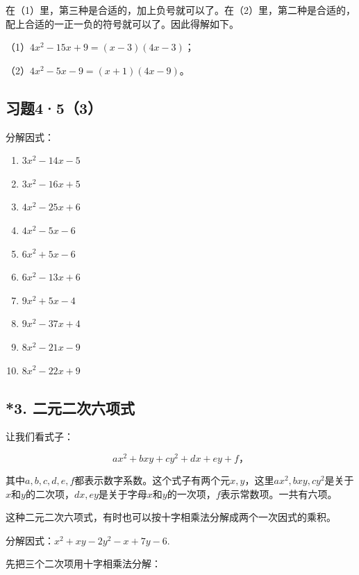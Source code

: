 在（1）里，第三种是合适的，加上负号就可以了。在（2）里，第二种是合适的，配上合适的一正一负的符号就可以了。因此得解如下。

 （1）\(4x^{2} - 15x + 9 = (x - 3)(4x - 3)\)；

（2）\(4x^{2} - 5x - 9 = (x + 1)(4x - 9)\)。

\subsection{习题4·5（3）}

分解因式：

\begin{enumerate}[start=1]
\item
  \(3x^{2}-14x-5\)
\item
  \(3x^{2}-16x+5\)
\item
  \(4x^{2}-25x+6\)
\item
  \(4x^{2}-5x-6\)
\item
  \(6x^{2}+5x-6\)
\item
  \(6x^{2}-13x+6\)
\item
  \(9x^{2}+5x-4\)
\item
  \(9x^{2}-37x+4\)
\item
  \(8x^{2}-21x-9\)
\item
  \(8x^{2}-22x+9\)
\end{enumerate}

\subsection{*3. 二元二次六项式}

让我们看式子：

\[
a x ^{2} + b x y + c y ^{2} + d x + e y + f\text{，}
\]

其中\(a, b, c, d, e, f\)都表示数字系数。这个式子有两个元\(x, y\)，这里\(ax^2, bxy, cy^2\)是关于\(x\)和\(y\)的二次项，\(dx, ey\)是关于字母\(x\)和\(y\)的一次项，\(f\)表示常数项。一共有六项。

这种二元二次六项式，有时也可以按十字相乘法分解成两个一次因式的乘积。


分解因式：\(x^{2} + xy - 2y^{2} - x + 7y - 6.\)


先把三个二次项用十字相乘法分解：

\begin{figure}
\centering
\end{figure}

